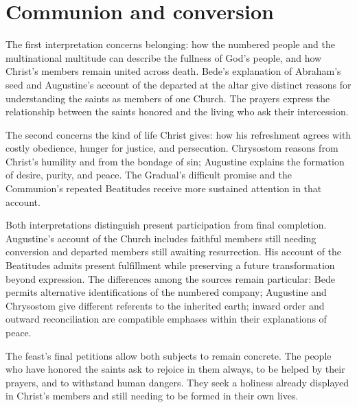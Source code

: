 \section{Communion and conversion}
The first interpretation concerns belonging: how the numbered people and
the multinational multitude can describe the fullness of God's people,
and how Christ's members remain united across death. Bede's explanation
of Abraham's seed and Augustine's account of the departed at the altar
give distinct reasons for understanding the saints as members of one
Church. The prayers express the relationship between the saints
honored and the living who ask their intercession.

The second concerns the kind of life Christ gives: how his refreshment
agrees with costly obedience, hunger for justice, and persecution.
Chrysostom reasons from Christ's humility and from the bondage of sin;
Augustine explains the formation of desire, purity, and peace. The
Gradual's difficult promise and the Communion's repeated Beatitudes
receive more sustained attention in that account.

Both interpretations distinguish present participation from final
completion. Augustine's account of the Church includes faithful
members still needing conversion and departed members still awaiting
resurrection. His account of the Beatitudes admits present fulfillment
while preserving a future transformation beyond expression.
The differences among the sources remain particular: Bede permits
alternative identifications of the numbered company; Augustine and
Chrysostom give different referents to the inherited earth; inward
order and outward reconciliation are compatible emphases within
their explanations of peace.

The feast's final petitions allow both subjects to remain concrete.
The people who have honored the saints ask to rejoice in them always,
to be helped by their prayers, and to withstand human dangers.
They seek a holiness already displayed in Christ's members and
still needing to be formed in their own lives.
